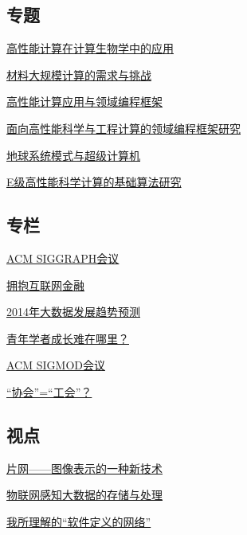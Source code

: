 \documentclass[a4paper]{article}
\begin{document}
\subsection{专题}
\href{http://history.ccf.org.cn/resources/1190201776262/2014/01/15/4.pdf}{高性能计算在计算生物学中的应用}

\href{http://history.ccf.org.cn/resources/1190201776262/2014/01/15/5.pdf}{材料大规模计算的需求与挑战}

\href{http://history.ccf.org.cn/resources/1190201776262/2014/01/15/0.pdf}{高性能计算应用与领域编程框架}

\href{http://history.ccf.org.cn/resources/1190201776262/2014/01/15/1.pdf}{面向高性能科学与工程计算的领域编程框架研究}

\href{http://history.ccf.org.cn/resources/1190201776262/2014/01/15/3.pdf}{地球系统模式与超级计算机}

\href{http://history.ccf.org.cn/resources/1190201776262/2014/01/15/2.pdf}{E级高性能科学计算的基础算法研究}

\subsection{专栏}
\href{http://history.ccf.org.cn/resources/1190201776262/2014/01/15/10.pdf}{ACM SIGGRAPH会议}

\href{http://history.ccf.org.cn/resources/1190201776262/2014/01/15/7.pdf}{拥抱互联网金融}

\href{http://history.ccf.org.cn/resources/1190201776262/2014/01/15/6.pdf}{2014年大数据发展趋势预测}

\href{http://history.ccf.org.cn/resources/1190201776262/2014/01/15/8.pdf}{青年学者成长难在哪里？}

\href{http://history.ccf.org.cn/resources/1190201776262/2014/01/15/11.pdf}{ACM SIGMOD会议}

\href{http://history.ccf.org.cn/resources/1190201776262/2014/01/15/9.pdf}{“协会”=“工会”？}

\subsection{视点}
\href{http://history.ccf.org.cn/resources/1190201776262/2014/01/15/12.pdf}{片网——图像表示的一种新技术}

\href{http://history.ccf.org.cn/resources/1190201776262/2014/01/15/13.pdf}{物联网感知大数据的存储与处理}

\href{http://history.ccf.org.cn/resources/1190201776262/2014/01/15/14.pdf}{我所理解的“软件定义的网络”}
\end{document}
